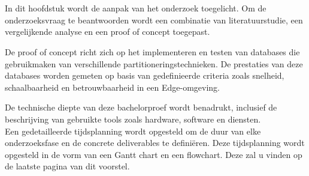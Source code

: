 
\chapter{}%
\label{ch:methodologie}


In dit hoofdstuk wordt de aanpak van het onderzoek toegelicht. 
 Om de onderzoeksvraag te beantwoorden wordt een combinatie van literatuurstudie, een vergelijkende analyse en een proof of concept toegepast.

De proof of concept richt zich op het implementeren en testen van databases die gebruikmaken van verschillende partitioneringstechnieken.
 De prestaties van deze databases worden gemeten op basis van gedefinieerde criteria zoals snelheid, schaalbaarheid en betrouwbaarheid in een Edge-omgeving.

De technische diepte van deze bachelorproef wordt benadrukt,
 inclusief de beschrijving van gebruikte tools zoals hardware, software en diensten. \\

Een gedetailleerde tijdsplanning wordt opgesteld om de duur van elke onderzoeksfase en de concrete deliverables te definiëren.
Deze tijdsplanning wordt opgesteld in de vorm van een Gantt chart en een flowchart. Deze zal u vinden op de laatste pagina van dit voorstel.

